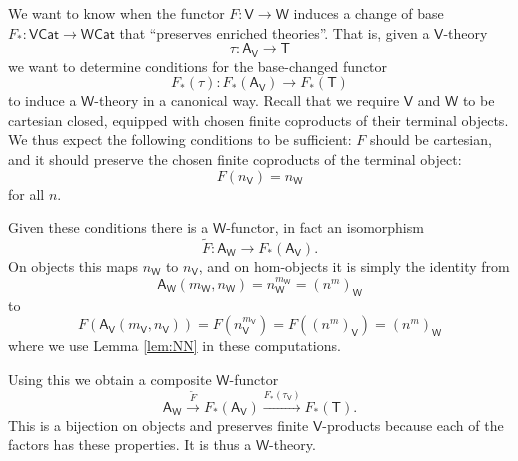 \documentclass{amsart}
\theoremstyle{definition}
\newcommand{\Cat}{\mathsf{Cat}}
\newcommand{\A}{\mathsf{A}}
\newcommand{\V}{\mathsf{V}}
\newcommand{\W}{\mathsf{W}}
\newcommand{\T}{\mathsf{T}}
\newcommand{\maps}{\colon}
\begin{document}
We want to know when the functor $F \maps \V \to \W$ induces a change of base $F_*\maps\V\Cat \to \W\Cat$ that ``preserves enriched theories''.   That is, given a $\V$-theory 
\[      \tau \maps  \A_\V \to \T \]
we want to determine conditions for the base-changed functor 
\[    F_*(\tau) \maps  F_*(\A_\V) \to  F_*(\T) \]
to induce a $\W$-theory in a canonical way.   Recall that we require $\V$ and $\W$ to be
cartesian closed, equipped with chosen finite coproducts of their terminal objects.   We thus 
expect the following conditions to be sufficient: $F$ should be cartesian, and it should
preserve the chosen finite coproducts of the terminal object:
\[      F(n_\V) = n_\W  \]
for all $n$.   

Given these conditions there is a $\W$-functor, in fact an isomorphism
\[    \tilde{F} \maps \A_\W \to F_*(\A_\V)  . \]
On objects this maps $n_\W$ to $n_\V$, and on hom-objects it is simply the identity from
\[     \A_\W(m_\W, n_\W) = n_\W^{m_\W} = (n^m)_\W \]
to 
\[    F(\A_\V(m_\V, n_\V)) = F(n_\V^{m_\V}) = F((n^m)_\V) = (n^m)_\W \]
where we use Lemma \ref{lem:NN} in these computations.

Using this we obtain a composite $\W$-functor
\[   \A_\W \stackrel{\tilde{F}}{\longrightarrow} 
  F_*(\A_\V) \stackrel{F_*(\tau_\V)}{\longrightarrow} F_*(\T). \]
This is a bijection on objects and preserves finite $\V$-products because each of the factors
has these properties.   It is thus a $\W$-theory.
\end{document}
